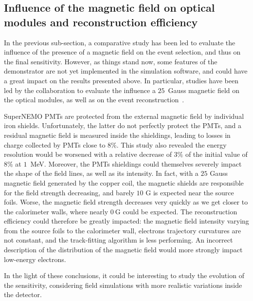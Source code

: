\subsection{Influence of the magnetic field on optical modules and reconstruction efficiency}

In the previous sub-section, a comparative study has been led to evaluate the influence of the presence of a magnetic field on the event selection, and thus on the final sensitivity.
However, as things stand now, some features of the demonstrator are not yet implemented in the simulation software, and could have a great impact on the results presented above.
In particular, studies have been led by the collaboration to evaluate the influence a $25$~Gauss magnetic field on the optical modules, as well as on the event reconstruction~\cite{CalvezThesis,internal:magnetic_field}.

SuperNEMO PMTs are protected from the external magnetic field by individual iron shields.
Unfortunately, the latter do not perfectly protect the PMTs, and a residual magnetic field is measured inside the shieldings, leading to losses in charge collected by PMTs close to $8\%$.
This study also revealed the energy resolution would be worsened with a relative decrease of $3\%$ of the initial value of $8\%$ at $1$~MeV.
Moreover, the PMTs shieldings could themselves severely impact the shape of the field lines, as well as its intensity.
In fact, with a $25$ Gauss magnetic field generated by the copper coil, the magnetic shields are responsible for the field strength decreasing, and barely $10$ G is expected near the source foils.
Worse, the magnetic field strength decreases very quickly as we get closer to the calorimeter walls, where nearly $0~$G could be expected.
The reconstruction efficiency could therefore be greatly impacted:
the magnetic field intensity varying from the source foils to the calorimeter wall, electrons trajectory curvatures are not constant, and the track-fitting algorithm is less performing.
An incorrect description of the distribution of the magnetic field would more strongly impact low-energy electrons.

In the light of these conclusions, it could be interesting to study the evolution of the sensitivity, considering field simulations with more realistic variations inside the detector.


